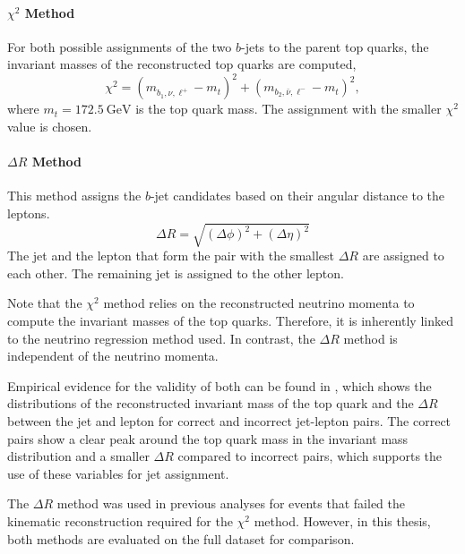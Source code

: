 \paragraph{$\chi^2$ Method}
    For both possible assignments of the two $b$-jets to the parent top quarks, the invariant masses of the reconstructed top quarks are computed,
    \begin{equation}
        \label{eq:chi_square}
        \chi^2 = (m_{b_1,{\nu},\ell^+} -
        m_{t})^2+(m_{b_2,\bar{\nu},\ell^-} - m_{t})^2,
    \end{equation}
    where $m_t = 172.5~\unit{\giga\electronvolt}$ is the top quark mass. The assignment with the smaller $\chi^2$ value is chosen.

\paragraph{$\Delta R$ Method}
    This method assigns the $b$-jet candidates based on their angular distance to the leptons.
    \begin{equation}
        \Delta R = \sqrt{(\Delta\phi)^2 + (\Delta\eta)^2}
    \end{equation}
The jet and the lepton that form the pair with the smallest $\Delta R$ are assigned to each other. The remaining jet is assigned to the other lepton.

Note that the $\chi^2$ method relies on the reconstructed neutrino momenta to compute the invariant masses of the top quarks. Therefore, it is inherently linked to the neutrino regression method used. In contrast, the $\Delta R$ method is independent of the neutrino momenta.

Empirical evidence for the validity of both can be found in , which shows the distributions of the reconstructed invariant mass of the top quark and the $\Delta R$
between the jet and lepton for correct and incorrect jet-lepton pairs. The correct pairs show a clear peak around the top quark mass in the invariant mass distribution and a smaller $\Delta R$ compared to incorrect pairs, which supports the use of these variables for jet assignment.

The $\Delta R$ method was used in previous \atlas analyses \cite{atlas_entanglement,atlas_toponium} for events that failed the kinematic reconstruction required for the $\chi^2$ method. However, in this thesis, both methods are evaluated on the full dataset for comparison.

